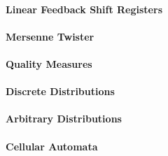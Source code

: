 \paragraph{Linear Feedback Shift Registers}

\paragraph{Mersenne Twister}

\paragraph{Quality Measures}




\paragraph{Discrete Distributions}

\paragraph{Arbitrary Distributions}



\paragraph{Cellular Automata}




